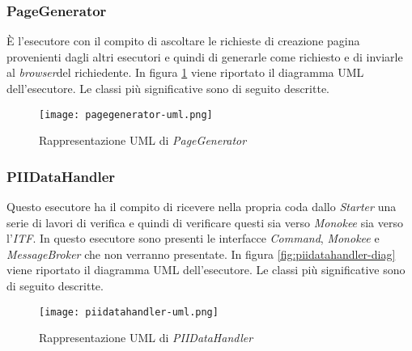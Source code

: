 \subsubsection{PageGenerator}
È l’esecutore con il compito di ascoltare le richieste di creazione pagina provenienti dagli altri esecutori e quindi di generarle come richiesto e di inviarle al \emph{browser}del richiedente. In figura \ref{fig:pagegenerator-uml-diag} viene riportato il diagramma UML dell'esecutore. Le classi più significative sono di seguito descritte.
\begin{figure}[htbp]
    \centering
    \texttt{[image: pagegenerator-uml.png]} 
    \caption{Rappresentazione UML di \emph{PageGenerator}}
    \label{fig:pagegenerator-uml-diag} 
\end{figure}
\begin{namespacedesc}
\end{namespacedesc}

\subsubsection{PIIDataHandler}
Questo esecutore ha il compito di ricevere nella propria coda dallo \emph{Starter} una serie di lavori di verifica e quindi di verificare questi sia verso \emph{Monokee} sia verso l’\emph{ITF}. In questo esecutore sono presenti le interfacce \emph{Command}, \emph{Monokee} e \emph{MessageBroker} che non verranno presentate. In figura \ref{fig:piidatahandler-diag} viene riportato il diagramma UML dell'esecutore. Le classi più significative sono di seguito descritte. 
\begin{figure}[htbp]
    \centering
    \texttt{[image: piidatahandler-uml.png]} 
    \caption{Rappresentazione UML di \emph{PIIDataHandler}}
    \label{fig:piidatahandler-uml-diag} 
\end{figure}

